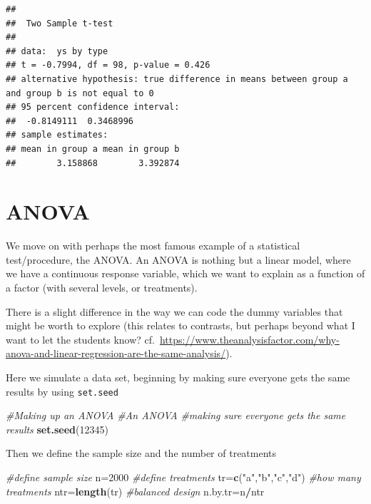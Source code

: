 \documentclass[
]{book}
\newenvironment{Shaded}{\begin{snugshade}}{\end{snugshade}}
\newcommand{\CommentTok}[1]{\textcolor[rgb]{0.56,0.35,0.01}{\textit{#1}}}
\newcommand{\DecValTok}[1]{\textcolor[rgb]{0.00,0.00,0.81}{#1}}
\newcommand{\FunctionTok}[1]{\textcolor[rgb]{0.13,0.29,0.53}{\textbf{#1}}}
\newcommand{\NormalTok}[1]{#1}
\newcommand{\OtherTok}[1]{\textcolor[rgb]{0.56,0.35,0.01}{#1}}
\newcommand{\SpecialCharTok}[1]{\textcolor[rgb]{0.81,0.36,0.00}{\textbf{#1}}}
\newcommand{\StringTok}[1]{\textcolor[rgb]{0.31,0.60,0.02}{#1}}
\begin{document}
\begin{verbatim}
## 
##  Two Sample t-test
## 
## data:  ys by type
## t = -0.7994, df = 98, p-value = 0.426
## alternative hypothesis: true difference in means between group a and group b is not equal to 0
## 95 percent confidence interval:
##  -0.8149111  0.3468996
## sample estimates:
## mean in group a mean in group b 
##        3.158868        3.392874
\end{verbatim}

\section{ANOVA}\label{anova}

We move on with perhaps the most famous example of a statistical test/procedure, the ANOVA. An ANOVA is nothing but a linear model, where we have a continuous response variable, which we want to explain as a function of a factor (with several levels, or treatments).

There is a slight difference in the way we can code the dummy variables that might be worth to explore (this relates to contrasts, but perhaps beyond what I want to let the students know? cf.~\url{https://www.theanalysisfactor.com/why-anova-and-linear-regression-are-the-same-analysis/}).

Here we simulate a data set, beginning by making sure everyone gets the same results by using \texttt{set.seed}

\begin{Shaded}
\begin{Highlighting}[]
\CommentTok{\#Making up an ANOVA}
\CommentTok{\#An ANOVA}
\CommentTok{\#making sure everyone gets the same results}
\FunctionTok{set.seed}\NormalTok{(}\DecValTok{12345}\NormalTok{)}
\end{Highlighting}
\end{Shaded}

Then we define the sample size and the number of treatments

\begin{Shaded}
\begin{Highlighting}[]
\CommentTok{\#define sample size}
\NormalTok{n}\OtherTok{=}\DecValTok{2000}
\CommentTok{\#define treatments}
\NormalTok{tr}\OtherTok{=}\FunctionTok{c}\NormalTok{(}\StringTok{"a"}\NormalTok{,}\StringTok{"b"}\NormalTok{,}\StringTok{"c"}\NormalTok{,}\StringTok{"d"}\NormalTok{)}
\CommentTok{\#how many treatments}
\NormalTok{ntr}\OtherTok{=}\FunctionTok{length}\NormalTok{(tr)}
\CommentTok{\#balanced design}
\NormalTok{n.by.tr}\OtherTok{=}\NormalTok{n}\SpecialCharTok{/}\NormalTok{ntr}
\end{Highlighting}
\end{Shaded}
\end{document}
